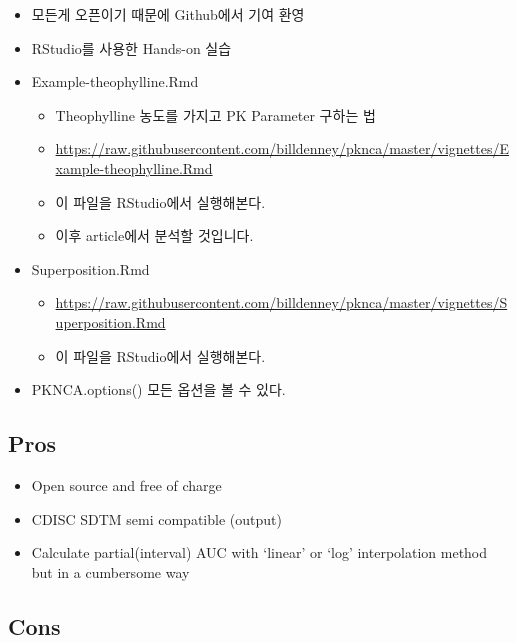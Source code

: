 \documentclass[
  10pt,
]{krantz}
\providecommand{\tightlist}{%
  \setlength{\itemsep}{0pt}\setlength{\parskip}{0pt}}
\renewcommand{\href}[2]{#2\footnote{\url{#1}}}
\begin{document}
\begin{itemize}
  \begin{itemize}
  \tightlist
  \item
    \href{mailto:wdenney@humanpredictions.com}{\nolinkurl{wdenney@humanpredictions.com}} 으로 메일 보내라
  \end{itemize}
\item
  모든게 오픈이기 때문에 Github에서 기여 환영
\item
  RStudio를 사용한 Hands-on 실습
\item
  Example-theophylline.Rmd

  \begin{itemize}
  \tightlist
  \item
    Theophylline 농도를 가지고 PK Parameter 구하는 법
  \item
    \url{https://raw.githubusercontent.com/billdenney/pknca/master/vignettes/Example-theophylline.Rmd}
  \item
    이 파일을 RStudio에서 실행해본다.
  \item
    이후 article에서 분석할 것입니다.
  \end{itemize}
\item
  Superposition.Rmd

  \begin{itemize}
  \tightlist
  \item
    \url{https://raw.githubusercontent.com/billdenney/pknca/master/vignettes/Superposition.Rmd}
  \item
    이 파일을 RStudio에서 실행해본다.
  \end{itemize}
\item
  PKNCA.options() 모든 옵션을 볼 수 있다.
\end{itemize}

\hypertarget{pros-1}{%
\subsection{Pros}\label{pros-1}}

\begin{itemize}
\tightlist
\item
  Open source and free of charge
\item
  CDISC SDTM semi compatible (output)
\item
  Calculate partial(interval) AUC with `linear' or `log' interpolation method but in a cumbersome way
\end{itemize}

\hypertarget{cons-1}{%
\subsection{Cons}\label{cons-1}}
\end{document}
